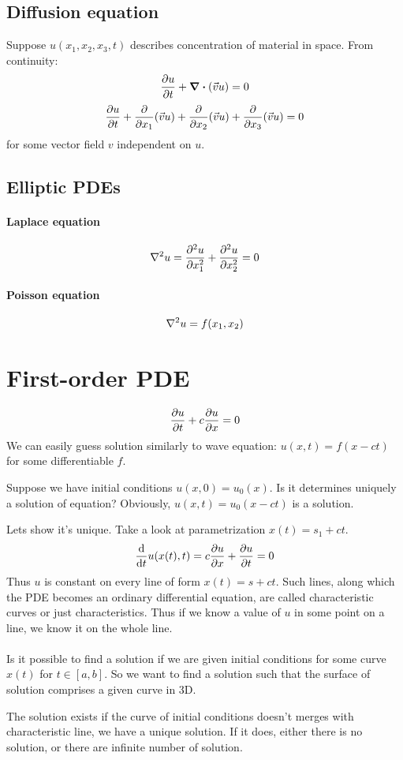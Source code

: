 \subsection{Diffusion equation}
Suppose
$u(x_1,x_2,x_3,t)$ describes concentration of material in space. From continuity:
$$\pdv{u}{t} + \div(\vec{v} u) = 0$$
$$\pdv{u}{t} +\pdv{ x_1} (\vec{v} u) +\pdv{ x_2} (\vec{v} u) +\pdv{ x_3} (\vec{v} u) = 0$$
for some vector field $v$ independent on $u$.
\subsection{Elliptic PDEs}
\paragraph{Laplace equation}
$$\laplacian{u}  = \pdv[2]{u}{x_1} + \pdv[2]{u}{x_2} = 0$$
\paragraph{Poisson equation}
$$\laplacian{u}  = f(x_1,x_2)$$
\section{First-order PDE}
$$\pdv{u}{t} + c\pdv{u}{x} = 0$$
We can easily guess solution similarly to wave equation: $u(x,t) = f(x-ct)$ for some differentiable $f$. 

Suppose we have initial conditions $u(x,0)= u_0(x)$. Is it determines uniquely a solution of equation? Obviously, $u(x,t) = u_0(x-ct)$ is a solution.

Lets show it's unique. Take a look at parametrization $x(t) = s_1 + ct$.
$$\dv{t} u(x(t),t) = c\pdv{u}{x}(x(t),t) + \pdv{u}{t}(x(t),t) = 0$$ 
Thus $u$ is constant on every line of form $x(t)=s+ct$. Such lines, along which the PDE becomes an ordinary differential equation, are called characteristic curves or just characteristics. Thus if we know a value of $u$ in some point on a line, we know it on the whole line.

\paragraph{} Is it possible to find a solution if we are given initial conditions for some curve $x(t)$ for $t \in [a,b]$. So we want to find a solution such that the surface of solution comprises a given curve in 3D.

The solution exists if the curve of initial conditions doesn't merges with characteristic line, we have a unique solution. If it does, either there is no solution, or there are infinite number of solution.

